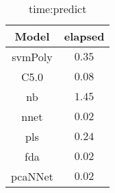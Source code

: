\begin{table}[!ht]
	\centering
	\begin{tabular}{|c|c|}
		\hline
		Model & elapsed \\ \hline
		svmPoly & $0.35$ \\ \hline
		C5.0 & $0.08$ \\ \hline
		nb & $1.45$ \\ \hline
		nnet & $0.02$ \\ \hline
		pls & $0.24$ \\ \hline
		fda & $0.02$ \\ \hline
		pcaNNet & $0.02$ \\ \hline
	\end{tabular}
	\caption{time:predict}
	\label{tab:time:predict}
\end{table}
